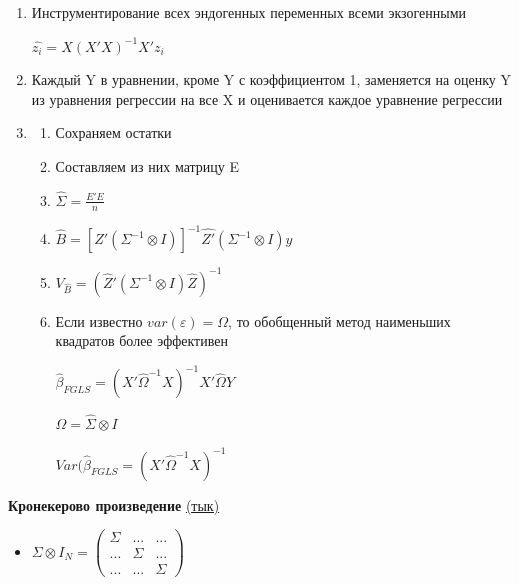 \documentclass[a4paper, 12pt]{article}
\begin{document}
\begin{enumerate}
    \item Инструментирование всех эндогенных переменных всеми экзогенными
    
    $\hat{z_{i}} = X(X'X)^{-1}X'z_{i}$
    
    \item Каждый Y в уравнении, кроме Y с коэффициентом 1, заменяется на оценку Y из уравнения регрессии на все X и оценивается каждое уравнение регрессии
    
    \item \begin{enumerate}
        \item Сохраняем остатки 
        \item Составляем из них матрицу E
        \item $\hat{\Sigma} = \frac{E'E}{n}$
        \item $\hat{B} = \left[ \hat{Z}'(\Sigma^{-1} \otimes I)\right]^{-1} \hat{Z'}(\Sigma^{-1} \otimes I)y$
        \item $V_{\hat{B}} = (\hat{Z}'(\Sigma^{-1} \otimes I) \hat{Z}) ^ {-1}$
        \item Если известно $var(\varepsilon) = \Omega$, то обобщенный метод наименьших квадратов более эффективен
        
        $\hat{\beta}_{FGLS} = (X'\hat{\Omega}^{-1}X)^{-1}X'\hat{\Omega} Y$
        
        $\hat{\Omega} = \hat{\Sigma} \otimes I$
        
        $Var(\hat{\beta}_{FGLS} = (X'\hat{\Omega}^{-1} X)^{-1}$
    \end{enumerate}
\end{enumerate}

\begin{center}
     \textbf{Кронекерово произведение} \href{https://ru.wikipedia.org/wiki/\%D0\%9F\%D1\%80\%D0\%BE\%D0\%B8\%D0\%B7\%D0\%B2\%D0\%B5\%D0\%B4\%D0\%B5\%D0\%BD\%D0\%B8\%D0\%B5_\%D0\%9A\%D1\%80\%D0\%BE\%D0\%BD\%D0\%B5\%D0\%BA\%D0\%B5\%D1\%80\%D0\%B0}{(тык)}
\end{center}

\begin{itemize}
    \item $\Sigma \otimes I_{N} = \begin{pmatrix}
    \Sigma & ... & ... \\
    ... & \Sigma & ... \\
    ... & ... & \Sigma
    \end{pmatrix}$
\end{itemize}
\end{document}
